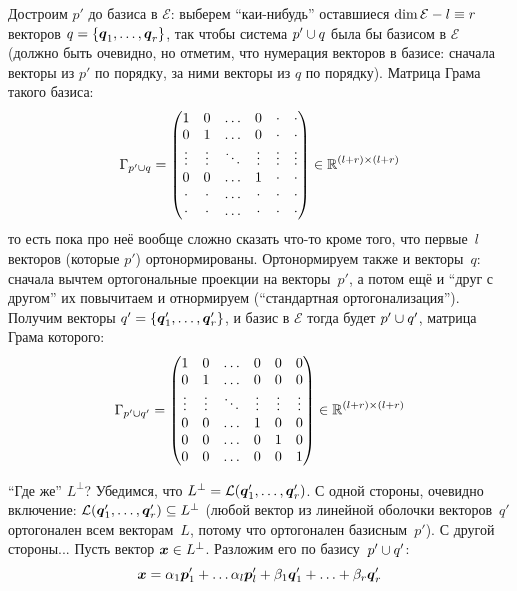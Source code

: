 \documentclass[a4paper,12pt]{article}
\begin{document}
  Достроим $p'$ до базиса в $\mathcal E$: выберем ``каи-нибудь'' оставшиеся $\dim \mathcal E \hm- l \hm\equiv r$ векторов $q \hm= \{\bds q_1, \ldots, \bds q_r\}$, так чтобы система $p' \hm\cup q$ была бы базисом в $\mathcal E$ (должно быть очевидно, но отметим, что нумерация векторов в базисе: сначала векторы из $p'$ по порядку, за ними векторы из $q$ по порядку).
  Матрица Грама такого базиса:
  \[
    \Gamma_{p' \cup q} = \begin{pmatrix}
      1      & 0      & \ldots & 0      & \cdot  & \cdot\\
      0      & 1      & \ldots & 0      & \cdot  & \cdot\\
      \vdots & \vdots & \ddots & \vdots & \vdots & \vdots\\
      0      & 0      & \ldots & 1      & \cdot  & \cdot\\
      \cdot  & \cdot  & \ldots & \cdot  & \cdot  & \cdot\\
      \cdot  & \cdot  & \ldots & \cdot  & \cdot  & \cdot
    \end{pmatrix} \in \operatorname{\mathbb R}^{(l + r) \times (l + r)}
  \]
  то есть пока про неё вообще сложно сказать что-то кроме того, что первые~$l$ векторов (которые $p'$) ортонормированы.
  Ортонормируем также и векторы~$q$: сначала вычтем ортогональные проекции на векторы~$p'$, а потом ещё и ``друг с другом'' их повычитаем и отнормируем (``стандартная ортогонализация'').
  Получим векторы $q' \hm= \{\bds q_1', \ldots, \bds q_r'\}$, и базис в $\mathcal E$ тогда будет $p' \hm\cup q'$, матрица Грама которого:
  \[
    \Gamma_{p' \cup q'} = \begin{pmatrix}
      1      & 0      & \ldots & 0      & 0      & 0\\
      0      & 1      & \ldots & 0      & 0      & 0\\
      \vdots & \vdots & \ddots & \vdots & \vdots & \vdots\\
      0      & 0      & \ldots & 1      & 0      & 0\\
      0      & 0      & \ldots & 0      & 1      & 0\\
      0      & 0      & \ldots & 0      & 0      & 1
    \end{pmatrix} \in \operatorname{\mathbb R}^{(l + r) \times (l + r)}
  \]
  
  ``Где же'' $L^{\perp}$?
  Убедимся, что $L^{\perp} \hm= \mathcal L(\bds q_1', \ldots, \bds q_r')$.
  С одной стороны, очевидно включение: $\mathcal L(\bds q_1', \ldots, \bds q_r') \hm\subseteq L^{\perp}$ (любой вектор из линейной оболочки векторов~$q'$ ортогонален всем векторам~$L$, потому что ортогонален базисным~$p'$).
  С другой стороны...
  Пусть вектор $\bds x \hm\in L^{\perp}$.
  Разложим его по базису~$p' \hm\cup q'$:
  \[
    \boldsymbol x = \alpha_1 \boldsymbol p_1' + \ldots \alpha_l \boldsymbol p_l' + \beta_1 \boldsymbol q_1' + \ldots + \beta_r \boldsymbol q_r'
  \]
  
\end{document}
